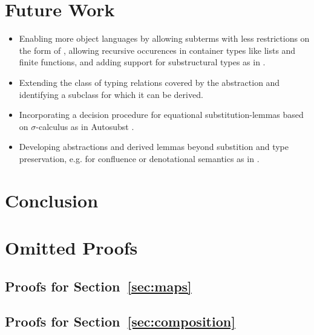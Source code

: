 \documentclass[sigplan,10pt, anonymous]{acmart}
\newenvironment{LibCode*}{%
  \begin{tcolorbox}[%
    colframe=white,%
    boxrule=0.0pt,%
    top=2.5pt,%
    left=2.5pt,%
    bottom=2.5pt,%
    right=2.5pt,%
    boxsep=0pt%
  ]\vspace{-0.2\baselineskip}%
}{%
  \vspace{-1\baselineskip}%
  \end{tcolorbox}%
}
\newcommand*\LibCode[1]{\begin{LibCode*}{#1}\end{LibCode*}}
\newcommand*\AppCode[1]{{#1}}
\newcommand*\ACode[1]{\AgdaFontStyle{\textcolor{mygray}{#1}}}
\newcommand*\ACon[1]{\AgdaInductiveConstructor{#1}}
\begin{document}
  \section{Future Work}
  \label{sec:future}
  \begin{itemize}
  \item
    Enabling more object languages by allowing subterms with less
    restrictions on the form of \ACode{S}, allowing recursive
    occurences in container types like lists and finite functions, and
    adding support for substructural types as in
    \cite{DBLP:journals/corr/abs-2005-02247}.
  \item
    Extending the class of typing relations covered by
    the \ACode{\ACon{TypingTraversal}} abstraction and identifying
    a subclass for which it can be derived.
  \item
    Incorporating a decision procedure for equational
    substitution-lemmas based on $\sigma$-calculus as in Autosubst
    \cite{DBLP:conf/itp/SchaferTS15, DBLP:conf/cpp/StarkSK19}.
  \item
    Developing abstractions and derived lemmas beyond substition and
    type preservation, e.g. for confluence or denotational semantics
    as in \cite{DBLP:journals/pacmpl/AllaisA0MM18}.
  \end{itemize}

  \section{Conclusion}
  \label{sec:conclusion}

  

  \clearpage
  \appendix
  \onecolumn

  \section{Omitted Proofs}
  \label{sec:proofs}

  \subsection{Proofs for Section~\ref{sec:maps}}
  \LibCode\KIdLift
  \LibCode\KIdLiftProof


  \subsection{Proofs for Section~\ref{sec:composition}}
  \LibCode\KComposeKitAp
  \LibCode\KComposeKitApProof
\end{document}

